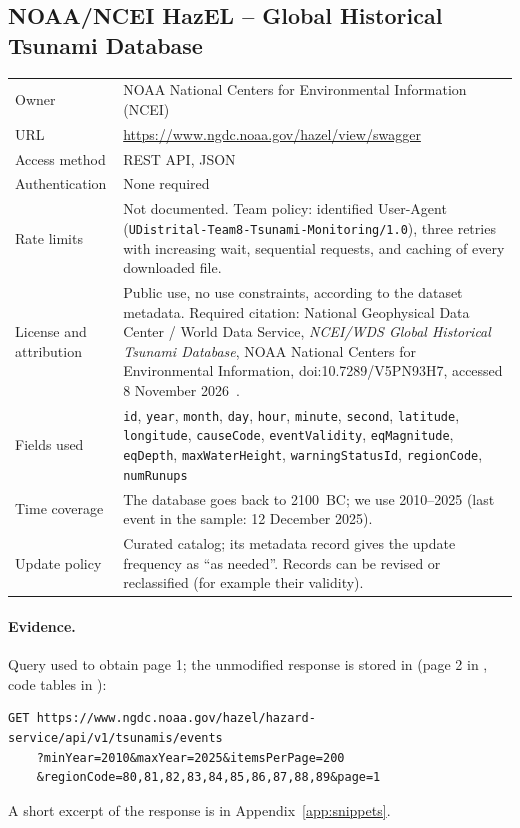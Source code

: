 \documentclass[a4paper,11pt,oneside]{book}
\begin{document}
\subsection{NOAA/NCEI HazEL -- Global Historical Tsunami Database}
\noindent\begin{tabularx}{\textwidth}{@{}lX@{}}
\toprule
Owner & NOAA National Centers for Environmental Information (NCEI) \\
URL & \url{https://www.ngdc.noaa.gov/hazel/view/swagger} \\
Access method & REST API, JSON \\
Authentication & None required \\
Rate limits & Not documented. Team policy: identified User-Agent (\texttt{UDistrital-Team8-Tsunami-Monitoring/1.0}), three retries with increasing wait, sequential requests, and caching of every downloaded file. \\
License and attribution & Public use, no use constraints, according to the dataset metadata. Required citation: National Geophysical Data Center / World Data Service, \emph{NCEI/WDS Global Historical Tsunami Database}, NOAA National Centers for Environmental Information, doi:10.7289/V5PN93H7, accessed 8 November 2026~\cite{hazel}. \\
Fields used & \texttt{id}, \texttt{year}, \texttt{month}, \texttt{day}, \texttt{hour}, \texttt{minute}, \texttt{second}, \texttt{latitude}, \texttt{longitude}, \texttt{causeCode}, \texttt{eventValidity}, \texttt{eqMagnitude}, \texttt{eqDepth}, \texttt{maxWaterHeight}, \texttt{warningStatusId}, \texttt{regionCode}, \texttt{numRunups} \\
Time coverage & The database goes back to 2100~BC; we use 2010--2025 (last event in the sample: 12 December 2025). \\
Update policy & Curated catalog; its metadata record gives the update frequency as ``as needed''. Records can be revised or reclassified (for example their validity). \\
\bottomrule
\end{tabularx}

\paragraph{Evidence.}
Query used to obtain page 1; the unmodified response is stored in  (page 2 in , code tables in ):
\begin{lstlisting}
GET https://www.ngdc.noaa.gov/hazel/hazard-service/api/v1/tsunamis/events
    ?minYear=2010&maxYear=2025&itemsPerPage=200
    &regionCode=80,81,82,83,84,85,86,87,88,89&page=1
\end{lstlisting}
A short excerpt of the response is in Appendix~\ref{app:snippets}.
\end{document}
